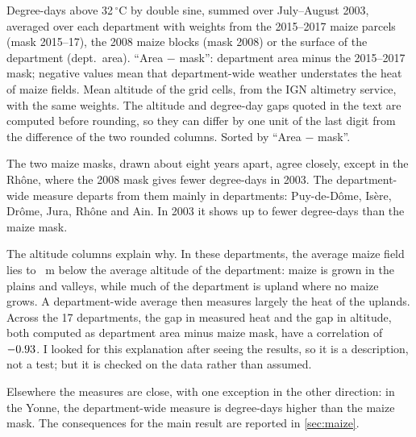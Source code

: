 \begin{table}[H]
\centering
\small
\caption{Degree-days above 32\,$^{\circ}$C in July--August 2003, by measure (main maize sample)}
\label{tab:relief}
\begin{threeparttable}
{\footnotesize\setlength{\tabcolsep}{4pt}}
\begin{tablenotes}\footnotesize
\item Degree-days above 32\,$^{\circ}$C by double sine, summed over July--August 2003, averaged over each department with weights from the 2015--2017 maize parcels (mask 2015--17), the 2008 maize blocks (mask 2008) or the surface of the department (dept.\ area). ``Area $-$ mask'': department area minus the 2015--2017 mask; negative values mean that department-wide weather understates the heat of maize fields. Mean altitude of the grid cells, from the IGN altimetry service, with the same weights. The altitude and degree-day gaps quoted in the text are computed before rounding, so they can differ by one unit of the last digit from the difference of the two rounded columns. Sorted by ``Area $-$ mask''.
\end{tablenotes}
\end{threeparttable}
\end{table}

The two maize masks, drawn about eight years apart, agree closely, except in the Rhône, where the 2008 mask gives \ReliefRhoneMaskGap{} fewer degree-days in 2003. The department-wide measure departs from them mainly in \ReliefCount{} departments: Puy-de-Dôme, Isère, Drôme, Jura, Rhône and Ain. In 2003 it shows up to \ReliefGapMax{} fewer degree-days than the maize mask.

The altitude columns explain why. In these \ReliefCount{} departments, the average maize field lies \ReliefAltDiffMin{} to \ReliefAltDiffMax{}~m below the average altitude of the department: maize is grown in the plains and valleys, while much of the department is upland where no maize grows. A department-wide average then measures largely the heat of the uplands. Across the 17 departments, the gap in measured heat and the gap in altitude, both computed as department area minus maize mask, have a correlation of $-0.93$. I looked for this explanation after seeing the results, so it is a description, not a test; but it is checked on the data rather than assumed.

Elsewhere the measures are close, with one exception in the other direction: in the Yonne, the department-wide measure is \ReliefYonneGap{} degree-days higher than the maize mask. The consequences for the main result are reported in \cref{sec:maize}.
